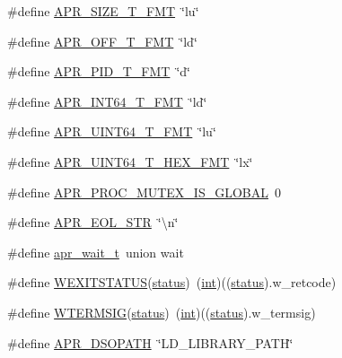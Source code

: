 \begin{DoxyCompactItemize}
\item 
\#define \hyperlink{group__apr__platform_ga86928aa34fa77f8e7855d69050e3a27a}{A\+P\+R\+\_\+\+S\+I\+Z\+E\+\_\+\+T\+\_\+\+F\+MT}~\char`\"{}lu\char`\"{}
\item 
\#define \hyperlink{group__apr__platform_gad71d0d5a325d1aedeb6328d6bdacac76}{A\+P\+R\+\_\+\+O\+F\+F\+\_\+\+T\+\_\+\+F\+MT}~\char`\"{}ld\char`\"{}
\item 
\#define \hyperlink{group__apr__platform_ga6c8e5aeab20eeaed373e3dd65cd33689}{A\+P\+R\+\_\+\+P\+I\+D\+\_\+\+T\+\_\+\+F\+MT}~\char`\"{}d\char`\"{}
\item 
\#define \hyperlink{group__apr__platform_ga41cc6dfe3d69cd66cffc8aae4b59bd08}{A\+P\+R\+\_\+\+I\+N\+T64\+\_\+\+T\+\_\+\+F\+MT}~\char`\"{}ld\char`\"{}
\item 
\#define \hyperlink{group__apr__platform_ga7fc21e56e167a47d7478600dee7ab502}{A\+P\+R\+\_\+\+U\+I\+N\+T64\+\_\+\+T\+\_\+\+F\+MT}~\char`\"{}lu\char`\"{}
\item 
\#define \hyperlink{group__apr__platform_ga528bc9f3c6f3500b35e97c4b25566b48}{A\+P\+R\+\_\+\+U\+I\+N\+T64\+\_\+\+T\+\_\+\+H\+E\+X\+\_\+\+F\+MT}~\char`\"{}lx\char`\"{}
\item 
\#define \hyperlink{group__apr__platform_ga90ebe3e3537fdff1e66c6baf4b560de8}{A\+P\+R\+\_\+\+P\+R\+O\+C\+\_\+\+M\+U\+T\+E\+X\+\_\+\+I\+S\+\_\+\+G\+L\+O\+B\+AL}~0
\item 
\#define \hyperlink{group__apr__platform_ga20953ff75ca59692aac949acfdaa25f6}{A\+P\+R\+\_\+\+E\+O\+L\+\_\+\+S\+TR}~\char`\"{}\textbackslash{}n\char`\"{}
\item 
\#define \hyperlink{group__apr__platform_ga13fae72fec73474a6b35ed86b9104bf5}{apr\+\_\+wait\+\_\+t}~union wait
\item 
\#define \hyperlink{group__apr__platform_ga77f17ed4771a558a0f16e5f3aecee222}{W\+E\+X\+I\+T\+S\+T\+A\+T\+US}(\hyperlink{group__apr__thread__proc_gae7daf19056dc6ab36e8f2e72e911646d}{status})~(\hyperlink{pcre_8txt_a42dfa4ff673c82d8efe7144098fbc198}{int})((\hyperlink{group__apr__thread__proc_gae7daf19056dc6ab36e8f2e72e911646d}{status}).w\+\_\+retcode)
\item 
\#define \hyperlink{group__apr__platform_ga94ec02a12424092a8391069adcd2ff73}{W\+T\+E\+R\+M\+S\+IG}(\hyperlink{group__apr__thread__proc_gae7daf19056dc6ab36e8f2e72e911646d}{status})~(\hyperlink{pcre_8txt_a42dfa4ff673c82d8efe7144098fbc198}{int})((\hyperlink{group__apr__thread__proc_gae7daf19056dc6ab36e8f2e72e911646d}{status}).w\+\_\+termsig)
\item 
\#define \hyperlink{group__apr__platform_ga2eb8121bd28ad578c3cbca3a68f6d823}{A\+P\+R\+\_\+\+D\+S\+O\+P\+A\+TH}~\char`\"{}L\+D\+\_\+\+L\+I\+B\+R\+A\+R\+Y\+\_\+\+P\+A\+TH\char`\"{}
\end{DoxyCompactItemize}
